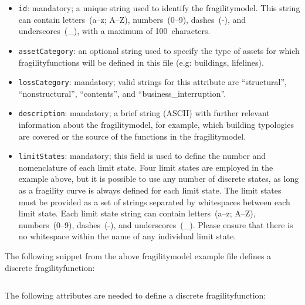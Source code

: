 \begin{itemize}

    \item \Verb+id+: mandatory; a unique string used to identify the 
      \gls{fragilitymodel}. This string can contain letters~(a--z; A--Z), 
      numbers~(0--9), dashes~(-), and underscores~(\_), with a maximum of 
      100~characters.

    \item \Verb+assetCategory+: an optional string used to specify the type of
      \glspl{asset} for which \glspl{fragilityfunction} will be defined in this
      file (e.g: buildings, lifelines).

    \item \Verb+lossCategory+: mandatory; valid strings for this attribute are 
      ``structural'', ``nonstructural'', ``contents'', and 
      ``business\_interruption''.

    \item \Verb+description+: mandatory; a brief string (ASCII) with further 
      relevant information about the \gls{fragilitymodel}, 
      for example, which building typologies are covered
      or the source of the functions in the \gls{fragilitymodel}.

    \item \Verb+limitStates+: mandatory; this field is used to define the number and 
      nomenclature of each limit state. Four limit states are employed in the 
      example above, but it is possible to use any number of discrete states,
      as long as a fragility curve is always defined for each limit state. The 
      limit states must be provided as a set of strings separated by whitespaces 
      between each limit state. Each limit state string can contain
      letters~(a--z; A--Z), numbers~(0--9), dashes~(-), and underscores~(\_).
      Please ensure that there is no whitespace within the name of any
      individual limit state.

\end{itemize}



The following snippet from the above \gls{fragilitymodel} example file defines a
discrete \gls{fragilityfunction}:

\inputminted[firstline=11,firstnumber=11,lastline=17,fontsize=\footnotesize,frame=single,linenos,bgcolor=lightgray]{xml}{oqum/risk/Verbatim/input_fragility.xml}

The following attributes are needed to define a discrete \gls{fragilityfunction}:

